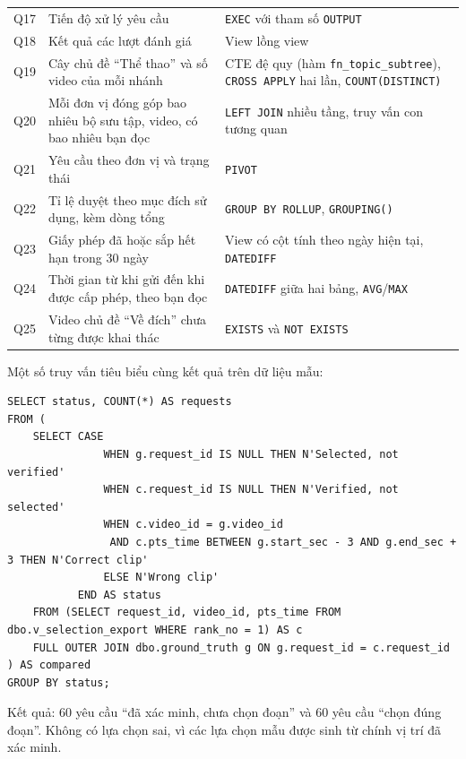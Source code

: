 \begin{longtable}{>{\raggedright\arraybackslash}p{0.85cm} >{\raggedright\arraybackslash}p{6.5cm} >{\raggedright\arraybackslash}p{6.5cm}}
Q17 & Tiến độ xử lý yêu cầu & \texttt{EXEC} với tham số \texttt{OUTPUT} \\
Q18 & Kết quả các lượt đánh giá & View lồng view \\
Q19 & Cây chủ đề ``Thể thao'' và số video của mỗi nhánh & CTE đệ quy (hàm \texttt{fn\_topic\_subtree}), \texttt{CROSS APPLY} hai lần, \texttt{COUNT(DISTINCT)} \\
Q20 & Mỗi đơn vị đóng góp bao nhiêu bộ sưu tập, video, có bao nhiêu bạn đọc & \texttt{LEFT JOIN} nhiều tầng, truy vấn con tương quan \\
Q21 & Yêu cầu theo đơn vị và trạng thái & \texttt{PIVOT} \\
Q22 & Tỉ lệ duyệt theo mục đích sử dụng, kèm dòng tổng & \texttt{GROUP BY ROLLUP}, \texttt{GROUPING()} \\
Q23 & Giấy phép đã hoặc sắp hết hạn trong 30 ngày & View có cột tính theo ngày hiện tại, \texttt{DATEDIFF} \\
Q24 & Thời gian từ khi gửi đến khi được cấp phép, theo bạn đọc & \texttt{DATEDIFF} giữa hai bảng, \texttt{AVG}/\texttt{MAX} \\
Q25 & Video chủ đề ``Về đích'' chưa từng được khai thác & \texttt{EXISTS} và \texttt{NOT EXISTS} \\
\end{longtable}

Một số truy vấn tiêu biểu cùng kết quả trên dữ liệu mẫu:

\begin{lstlisting}[caption={Q5. Đối chiếu đoạn đã chọn với vị trí đã xác minh bằng FULL OUTER JOIN}, label={lst:q5}]
SELECT status, COUNT(*) AS requests
FROM (
    SELECT CASE
               WHEN g.request_id IS NULL THEN N'Selected, not verified'
               WHEN c.request_id IS NULL THEN N'Verified, not selected'
               WHEN c.video_id = g.video_id
                AND c.pts_time BETWEEN g.start_sec - 3 AND g.end_sec + 3 THEN N'Correct clip'
               ELSE N'Wrong clip'
           END AS status
    FROM (SELECT request_id, video_id, pts_time FROM dbo.v_selection_export WHERE rank_no = 1) AS c
    FULL OUTER JOIN dbo.ground_truth g ON g.request_id = c.request_id
) AS compared
GROUP BY status;
\end{lstlisting}

Kết quả: 60 yêu cầu ``đã xác minh, chưa chọn đoạn'' và 60 yêu cầu ``chọn đúng đoạn''.
Không có lựa chọn sai, vì các lựa chọn mẫu được sinh từ chính vị trí đã xác minh.


